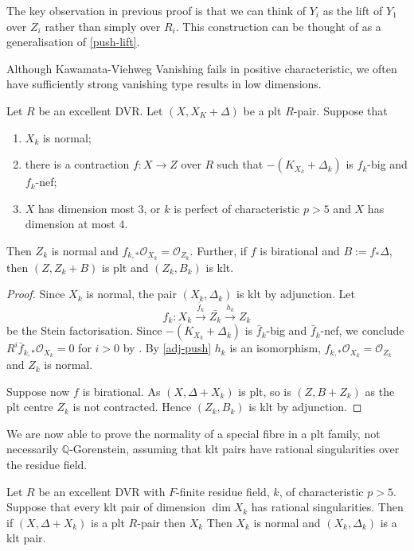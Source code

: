 \documentclass[a4paper,12pt]{book}
\newcommand{\ox}[1][X]{\mathcal{O}_{#1}}
\begin{document}
\begin{remark}
	The key observation in previous proof is that we can think of $Y_{i}$ as the lift of $Y_{1}$ over $Z_{i}$ rather than simply over $R_{i}$. This construction can be thought of as a generalisation of \autoref{push-lift}.
\end{remark}

Although Kawamata-Viehweg Vanishing fails in positive characteristic, we often have sufficiently strong vanishing type results in low dimensions.

\begin{lemma}\label{invAdj2}
	Let $R$ be an excellent DVR.
	Let $(X,X_{K}+\Delta)$ be a plt $R$-pair. Suppose that
	\begin{enumerate}
		\item $X_k$ is normal;
		\item there is a contraction $f \colon X \to Z$ over $R$ such that $-(K_{X_{k}}+\Delta_{k})$ is $f_{k}$-big and $f_k$-nef;
		\item $X$ has dimension most $3$, or $k$ is perfect of characteristic $p>5$ and $X$ has dimension at most $4$.
	\end{enumerate}  
	Then $Z_{k}$ is normal and $f_{k,*}\ox[X_{k}]=\ox[Z_{k}]$. Further, if $f$ is birational and $B:=f_{*}\Delta$, then $(Z, Z_k+B)$ is plt and $(Z_{k},B_{k})$ is klt.
\end{lemma}

\begin{proof}
	Since $X_{k}$ is normal, the pair $(X_{k},\Delta_{k})$ is klt by adjunction. 
	Let $$f_{k}\colon X_{k} \xrightarrow{\bar{f}_{k}} \bar{Z_k} \xrightarrow{h_k} Z_{k}$$ be the Stein factorisation. 
	Since $-(K_{X_{k}}+\Delta_{k})$ is $\bar{f}_{k}$-big and $\bar{f}_{k}$-nef, we conclude $R^{i}\bar{f}_{k,*}\ox[X_{k}]=0$ for $i> 0$ by \cite[Proposition 3.2]{tanaka2018minimal}.
	By \autoref{adj-push} $h_k$ is an isomorphism, $f_{k,*}\ox[X_{k}]=\ox[Z_{k}]$ and $Z_{k}$ is normal.
	
	Suppose now $f$ is birational. As $(X,\Delta+X_k)$ is plt, so is $(Z,B+Z_k)$ as the plt centre $Z_k$ is not contracted. Hence $(Z_k,B_k)$ is klt by adjunction.			
\end{proof}

We are now able to prove the normality of a special fibre in a plt family, not necessarily $\mathbb{Q}$-Gorenstein, assuming that klt pairs have rational singularities over the residue field.

\begin{theorem}
	Let $R$ be an excellent DVR with $F$-finite residue field, $k$, of characteristic $p> 5$. Suppose that every klt pair of dimension $\dim X_{k}$ has rational singularities. Then if $(X,\Delta+X_{k})$ is a plt $R$-pair then $X_{k}$ Then $X_{k}$ is normal and $(X_{k}, \Delta_{k})$ is a klt pair.
\end{theorem}
\end{document}
